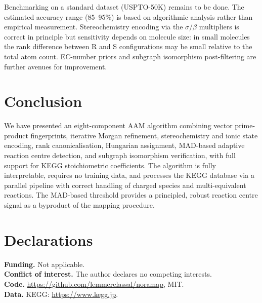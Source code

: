 \documentclass[12pt,a4paper]{article}
\begin{document}
Benchmarking on a standard dataset (USPTO-50K) remains to be done.
The estimated accuracy range (85--95\%) is based on algorithmic
analysis rather than empirical measurement. Stereochemistry encoding
via the $\sigma$/$\beta$ multipliers is correct in principle but
sensitivity depends on molecule size: in small molecules the rank
difference between R and S configurations may be small relative to
the total atom count. EC-number priors and subgraph isomorphism
post-filtering are further avenues for improvement.

\section{Conclusion}

We have presented an eight-component AAM algorithm combining vector
prime-product fingerprints, iterative Morgan refinement, stereochemistry
and ionic state encoding, rank canonicalisation, Hungarian assignment,
MAD-based adaptive reaction centre detection, and subgraph isomorphism
verification, with full support for KEGG stoichiometric coefficients.
The algorithm is fully interpretable, requires no training data, and
processes the KEGG database via a parallel pipeline with correct
handling of charged species and multi-equivalent reactions. The
MAD-based threshold provides a principled, robust reaction centre
signal as a byproduct of the mapping procedure.

\section*{Declarations}

\noindent\textbf{Funding.} Not applicable.\\
\textbf{Conflict of interest.} The author declares no competing interests.\\
\textbf{Code.} \url{https://github.com/lemmerelassal/noramap}, MIT.\\
\textbf{Data.} KEGG: \url{https://www.kegg.jp}.
\end{document}
